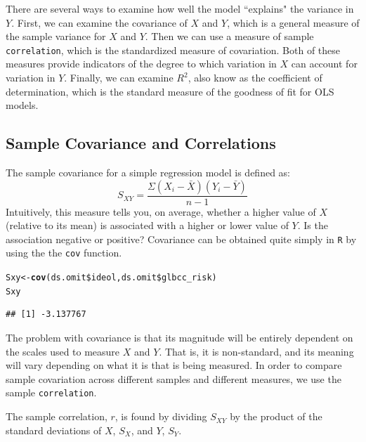 \documentclass[11pt,openany]{book}\usepackage[]{graphicx}\usepackage[]{color}
\makeatletter
\newcommand{\hlopt}[1]{\textcolor[rgb]{0,0,0}{#1}}%
\newcommand{\hlstd}[1]{\textcolor[rgb]{0.345,0.345,0.345}{#1}}%
\newcommand{\hlkwb}[1]{\textcolor[rgb]{0.69,0.353,0.396}{#1}}%
\newcommand{\hlkwd}[1]{\textcolor[rgb]{0.737,0.353,0.396}{\textbf{#1}}}%
\newenvironment{kframe}{%
 \def\at@end@of@kframe{}%
 \ifinner\ifhmode%
  \def\at@end@of@kframe{\end{minipage}}%
  \begin{minipage}{\columnwidth}%
 \fi\fi%
 \def\FrameCommand##1{\hskip\@totalleftmargin \hskip-\fboxsep
 \colorbox{shadecolor}{##1}\hskip-\fboxsep
     \hskip-\linewidth \hskip-\@totalleftmargin \hskip\columnwidth}%
 \MakeFramed {\advance\hsize-\width
   \@totalleftmargin\z@ \linewidth\hsize
   \@setminipage}}%
 {\par\unskip\endMakeFramed%
 \at@end@of@kframe}
\newenvironment{knitrout}{}{} %
\renewenvironment{knitrout}{\begin{singlespace}}{\end{singlespace}}
\makeatother
\begin{document}
There are several ways to examine how well the model ``explains" the variance in $Y$. First, we can examine the covariance of $X$ and $Y$, which is a general measure of the sample variance for $X$ and $Y$. Then we can use a measure of sample \texttt{correlation}, which is the standardized measure of covariation. Both of these measures provide indicators of the degree to which variation in $X$ can account for variation in $Y$. Finally, we can examine $R^{2}$, also know as the coefficient of determination, which is the standard measure of the goodness of fit for OLS models. 

\subsection{Sample Covariance and Correlations}
 
The sample covariance for a simple regression model is defined as:
\begin{equation}
S_{XY} = \frac {\Sigma(X_{i}-\bar X)(Y_{i}-\bar Y)}{n-1}
\end{equation}
Intuitively, this measure tells you, on average, whether a higher value of $X$ (relative to its mean) is associated with a higher or lower value of $Y$. Is the association negative or positive? Covariance can be obtained quite simply in \texttt{R} by using the the \texttt{cov} function.
\begin{knitrout}
\color{fgcolor}\begin{kframe}
\begin{alltt}
\hlstd{Sxy} \hlkwb{<-} \hlkwd{cov}\hlstd{(ds.omit}\hlopt{\$}\hlstd{ideol, ds.omit}\hlopt{\$}\hlstd{glbcc_risk)}
\hlstd{Sxy}
\end{alltt}
\begin{verbatim}
## [1] -3.137767
\end{verbatim}
\end{kframe}
\end{knitrout}

The problem with covariance is that its magnitude will be entirely dependent on the scales used to measure $X$ and $Y$. That is, it is non-standard, and its meaning will vary depending on what it is that is being measured. In order to compare sample covariation across different samples and different measures, we use the sample \texttt{correlation}.

The sample correlation, $r$, is found by dividing $S_{XY}$ by the product of the standard deviations of $X$, $S_{X}$, and $Y$, $S_{Y}$. 
\end{document}
